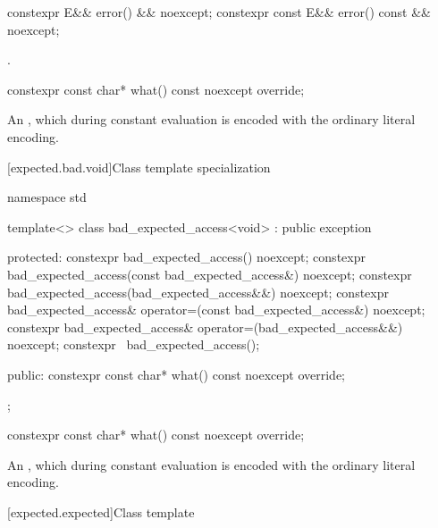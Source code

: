 %
\begin{itemdecl}
constexpr E&& error() && noexcept;
constexpr const E&& error() const && noexcept;
\end{itemdecl}

\begin{itemdescr}
\pnum
\returns
{}.
\end{itemdescr}

%
\begin{itemdecl}
constexpr const char* what() const noexcept override;
\end{itemdecl}

\begin{itemdescr}
\pnum
\returns
An  \ntbs,
which during constant evaluation is encoded with
the ordinary literal encoding.
\end{itemdescr}

[expected.bad.void]{Class template specialization }

\begin{codeblock}
namespace std {
  template<>
  class bad_expected_access<void> : public exception {
  protected:
    constexpr bad_expected_access() noexcept;
    constexpr bad_expected_access(const bad_expected_access&) noexcept;
    constexpr bad_expected_access(bad_expected_access&&) noexcept;
    constexpr bad_expected_access& operator=(const bad_expected_access&) noexcept;
    constexpr bad_expected_access& operator=(bad_expected_access&&) noexcept;
    constexpr ~bad_expected_access();

  public:
    constexpr const char* what() const noexcept override;
  };
}
\end{codeblock}

%
\begin{itemdecl}
constexpr const char* what() const noexcept override;
\end{itemdecl}

\begin{itemdescr}
\pnum
\returns
An  \ntbs,
which during constant evaluation is encoded with
the ordinary literal encoding.
\end{itemdescr}

[expected.expected]{Class template }

